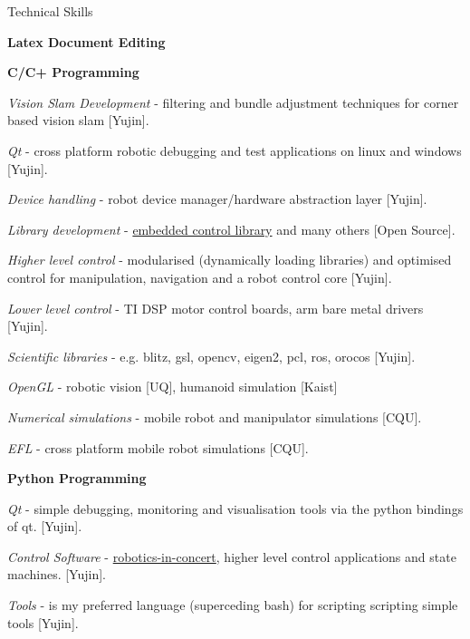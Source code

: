 \documentclass[a4paper,10pt]{article}
\begin{document}
\begin{cvsection}{Technical Skills}
 \raggedright
  \begin{djs_itemize}
    \item \textbf{Latex Document Editing}
    \item \textbf{C/C+ Programming}
    \begin{djs_itemize}
      \item \textit{Vision Slam Development} - filtering and bundle adjustment techniques for corner based vision slam [Yujin].
      \item \textit{Qt} - cross platform robotic debugging and test applications on linux and windows [Yujin].
      \item \textit{Device handling} - robot device manager/hardware abstraction layer [Yujin].
      \item \textit{Library development} - \href{http://snorriheim.dnsdojo.com/redmine/wiki/ecl}{embedded control library} and many others [Open Source].
      \item \textit{Higher level control} - modularised (dynamically loading libraries) and optimised control for manipulation, navigation and a robot control core [Yujin].
      \item \textit{Lower level control} - TI DSP motor control boards, arm bare metal drivers [Yujin].
      \item \textit{Scientific libraries} - e.g. blitz, gsl, opencv, eigen2, pcl, ros, orocos [Yujin].
      \item \textit{OpenGL} - robotic vision [UQ], humanoid simulation [Kaist]
      \item \textit{Numerical simulations} - mobile robot and manipulator simulations [CQU].
      \item \textit{EFL} - cross platform mobile robot simulations [CQU].
    \end{djs_itemize}
    \item \textbf{Python Programming}
    \begin{djs_itemize}
      \item \textit{Qt} - simple debugging, monitoring and visualisation tools via the python bindings of qt. [Yujin].
      \item \textit{Control Software} - \href{https://github.com/robotics-in-concert}{robotics-in-concert}, higher level control applications and state machines. [Yujin].
      \item \textit{Tools} - is my preferred language (superceding bash) for scripting scripting simple tools [Yujin].

\end{djs_itemize}
\end{djs_itemize}
\end{cvsection}
\end{document}
